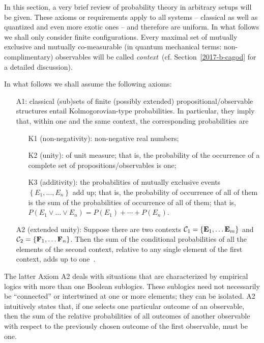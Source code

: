 In this section, a very brief review of probability theory in arbitrary setups will be given.
These axioms or requirements apply to all systems
-- classical as well as quantized and even more exotic ones --
and therefore are uniform.
In what follows we shall only consider finite configurations.
Every maximal set of mutually exclusive and mutually co-measurable (in quantum mechanical terms: non-complimentary)
observables will be called {\em context}~(cf. Section~\ref{2017-b-cagod} for a detailed discussion).

In what follows we shall assume the following axioms:
\begin{enumerate}
\item[A1:] classical (sub)sets of finite (possibly extended) propositional/observable structures
entail Kolmogorovian-type probabilities.
In particular, they imply that, within one and the same context, the corresponding probabilities are
\begin{enumerate}
\item[K1] (non-negativity):  non-negative real numbers;
\item[K2] (unity):  of unit measure; that is, the probability of the occurrence of a complete set of propositions/observables is one;
\item[K3] (additivity):  the probabilities of mutually exclusive events $
\left\{
E_1, \ldots , E_n
\right\}
$ add up; that is, the probability
of occurrence of all of them is the sum of the probabilities of occurrence  of all of them; that is,
$
P\left(E_1\vee \ldots \vee E_n \right) =
P\left(E_1\right) + \cdots + P\left(E_n \right)
$.
\end{enumerate}
\item[A2] (extended unity):
Suppose there are two contexts ${\cal C}_1=\{ {\bf E}_1, \ldots {\bf E}_m\}$
and
${\cal C}_2=\{ {\bf F}_1, \ldots {\bf F}_n\}$.
Then the sum of the conditional probabilities of all the elements of the second context,
relative to any single element of the first context, adds up to one~\cite{svozil-2019-k}.
\end{enumerate}

The latter Axiom A2 deals with situations that are characterized by empirical logics with more than one Boolean sublogics.
These sublogics need not necessarily be ``connected'' or intertwined at one or more elements; they can be isolated.
A2 intuitively states that, if one selects one particular outcome of an observable, then the sum of
the relative probabilities of all outcomes of another observable with respect to the previously chosen outcome of the first observable, must be one.



